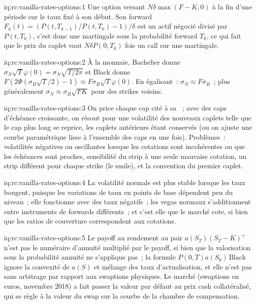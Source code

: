 \begin{solution}{iq:rc:vanilla-rates-options:1}
Une option versant $N\delta\max(F-K,0)$ à la fin d'une période sur le taux fixé à
son début. Son forward $F_k(t) = (P(t,T_{k-1})/P(t,T_k)-1)/\delta$ est un actif
négocié divisé par $P(t,T_k)$, c'est donc une martingale sous la probabilité forward
$T_k$, ce qui fait que le prix du caplet vaut $N\delta P(0,T_k)$ fois un call sur une
martingale.
\end{solution}

\begin{solution}{iq:rc:vanilla-rates-options:2}
À la monnaie, Bachelier donne $\sigma_N\sqrt{T}\varphi(0) = \sigma_N\sqrt{T/2\pi}$
et Black donne $F(2\Phi(\sigma_B\sqrt T/2)-1)\approx F\sigma_B\sqrt{T}\varphi(0)$.
En égalisant~: $\sigma_N\approx F\sigma_B$~; plus généralement $\sigma_N\approx\sigma_B\sqrt{FK}$
pour des strikes voisins.
\end{solution}

\begin{solution}{iq:rc:vanilla-rates-options:3}
On price chaque cap cité à sa ~; avec des caps d'échéance croissante,
on résout pour une volatilité des nouveaux caplets telle que le cap plus long se reprice,
les caplets antérieurs étant conservés (ou on ajuste une courbe paramétrique lisse à l'ensemble des caps en une fois).
Problèmes~: volatilités négatives ou oscillantes lorsque les cotations sont incohérentes ou
que les échéances sont proches, sensibilité du strip à une seule mauvaise cotation, un strip
différent pour chaque strike (le smile), et la convention du premier caplet.
\end{solution}

\begin{solution}{iq:rc:vanilla-rates-options:4}
La volatilité normale est plus stable lorsque les taux bougent, puisque les variations de taux
en points de base dépendent peu du niveau~; elle fonctionne avec des taux négatifs~; les vegas
normaux s'additionnent entre instruments de forwards différents~; et c'est elle que le marché cote, si bien que les
ratios de couverture correspondent aux cotations.
\end{solution}

\begin{solution}{iq:rc:vanilla-rates-options:5}
Le payoff au rendement au pair $a(S_T)(S_T-K)^+$ n'est pas le numéraire d'annuité multiplié par le
payoff, si bien que la valorisation sous la probabilité annuité ne s'applique pas~; la formule
$P(0,T)a(S_0)\,\mathrm{Black}$ ignore la convexité de $a(S)$ et mélange
des taux d'actualisation, et elle n'est pas sans arbitrage par rapport aux swaptions physiques. Le
marché (swaptions en euros, novembre 2018) a fait passer la valeur par défaut au
prix cash collatéralisé, qui se règle à la valeur du swap sur la courbe de la chambre de compensation.
\end{solution}


